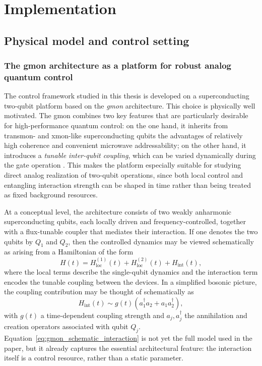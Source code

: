 \chapter{Implementation}
\label{chap:implementation}

\section{Physical model and control setting}
\subsection{The gmon architecture as a platform for robust analog quantum control}
\label{subsec:gmon_architecture_motivation}

The control framework studied in this thesis is developed on a superconducting two-qubit platform based on the \emph{gmon} architecture. This choice is physically well motivated. The gmon combines two key features that are particularly desirable for high-performance quantum control: on the one hand, it inherits from transmon- and xmon-like superconducting qubits the advantages of relatively high coherence and convenient microwave addressability; on the other hand, it introduces a \emph{tunable inter-qubit coupling}, which can be varied dynamically during the gate operation \cite{Chen2014,Niu2019,Krantz2019}. This makes the platform especially suitable for studying direct analog realization of two-qubit operations, since both local control and entangling interaction strength can be shaped in time rather than being treated as fixed background resources.

At a conceptual level, the architecture consists of two weakly anharmonic superconducting qubits, each locally driven and frequency-controlled, together with a flux-tunable coupler that mediates their interaction. If one denotes the two qubits by $Q_1$ and $Q_2$, then the controlled dynamics may be viewed schematically as arising from a Hamiltonian of the form
\begin{equation}
H(t)
=
H_{\mathrm{loc}}^{(1)}(t)
+
H_{\mathrm{loc}}^{(2)}(t)
+
H_{\mathrm{int}}(t),
\label{eq:gmon_schematic_hamiltonian}
\end{equation}
where the local terms describe the single-qubit dynamics and the interaction term encodes the tunable coupling between the devices. In a simplified bosonic picture, the coupling contribution may be thought of schematically as
\begin{equation}
H_{\mathrm{int}}(t)
\sim
g(t)
\left(
a_1^\dagger a_2 + a_1 a_2^\dagger
\right),
\label{eq:gmon_schematic_interaction}
\end{equation}
with $g(t)$ a time-dependent coupling strength and $a_j,a_j^\dagger$ the annihilation and creation operators associated with qubit $Q_j$. Equation~\eqref{eq:gmon_schematic_interaction} is not yet the full model used in the paper, but it already captures the essential architectural feature: the interaction itself is a control resource, rather than a static parameter.


